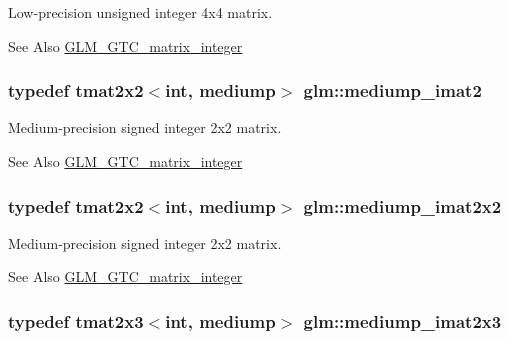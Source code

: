 Low-\/precision unsigned integer 4x4 matrix. \begin{DoxySeeAlso}{See Also}
\hyperlink{group__gtc__matrix__integer}{G\-L\-M\-\_\-\-G\-T\-C\-\_\-matrix\-\_\-integer} 
\end{DoxySeeAlso}
\hypertarget{group__gtc__matrix__integer_gae812330b83568359273b6ec96b002863}{
\subsubsection[{mediump\-\_\-imat2}]{\setlength{\rightskip}{0pt plus 5cm}typedef tmat2x2$<$int, mediump$>$ {\bf glm\-::mediump\-\_\-imat2}}}\label{group__gtc__matrix__integer_gae812330b83568359273b6ec96b002863}
Medium-\/precision signed integer 2x2 matrix. \begin{DoxySeeAlso}{See Also}
\hyperlink{group__gtc__matrix__integer}{G\-L\-M\-\_\-\-G\-T\-C\-\_\-matrix\-\_\-integer} 
\end{DoxySeeAlso}
\hypertarget{group__gtc__matrix__integer_ga52a40f2f95562746fd8084726a300963}{
\subsubsection[{mediump\-\_\-imat2x2}]{\setlength{\rightskip}{0pt plus 5cm}typedef tmat2x2$<$int, mediump$>$ {\bf glm\-::mediump\-\_\-imat2x2}}}\label{group__gtc__matrix__integer_ga52a40f2f95562746fd8084726a300963}
Medium-\/precision signed integer 2x2 matrix. \begin{DoxySeeAlso}{See Also}
\hyperlink{group__gtc__matrix__integer}{G\-L\-M\-\_\-\-G\-T\-C\-\_\-matrix\-\_\-integer} 
\end{DoxySeeAlso}
\hypertarget{group__gtc__matrix__integer_ga07314e9f05b82367570ca44c3ef7c0a7}{
\subsubsection[{mediump\-\_\-imat2x3}]{\setlength{\rightskip}{0pt plus 5cm}typedef tmat2x3$<$int, mediump$>$ {\bf glm\-::mediump\-\_\-imat2x3}}}\label{group__gtc__matrix__integer_ga07314e9f05b82367570ca44c3ef7c0a7}
